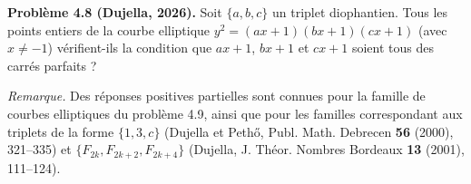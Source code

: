 \textbf{Problème 4.8 (Dujella, 2026).} Soit $\{a,b,c\}$ un triplet diophantien. Tous les points entiers de la courbe elliptique $y^2=(ax+1)(bx+1)(cx+1)$ (avec $x \neq -1$) vérifient-ils la condition que $ax+1$, $bx+1$ et $cx+1$ soient tous des carrés parfaits ?

\medskip

\textit{Remarque.} Des réponses positives partielles sont connues pour la famille de courbes elliptiques du problème 4.9, ainsi que pour les familles correspondant aux triplets de la forme $\{1,3,c\}$ (Dujella et Pethő, Publ. Math. Debrecen \textbf{56} (2000), 321--335) et $\{F_{2k},F_{2k+2},F_{2k+4}\}$ (Dujella, J. Théor. Nombres Bordeaux \textbf{13} (2001), 111--124).
